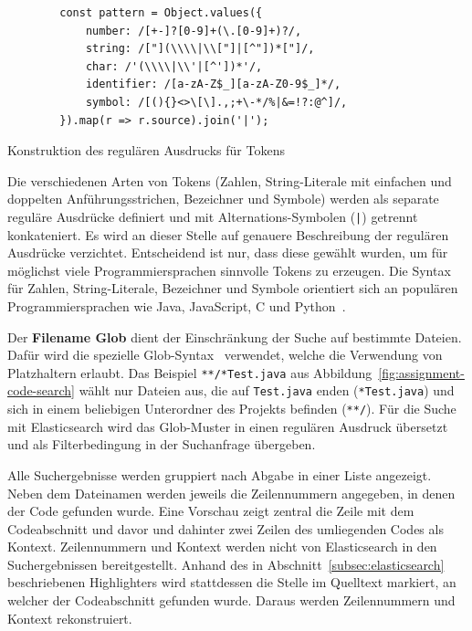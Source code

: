 \begin{listing}
    \centering
    \begin{verbatim}
        const pattern = Object.values({
            number: /[+-]?[0-9]+(\.[0-9]+)?/,
            string: /["](\\\\|\\["]|[^"])*["]/,
            char: /'(\\\\|\\'|[^'])*'/,
            identifier: /[a-zA-Z$_][a-zA-Z0-9$_]*/,
            symbol: /[(){}<>\[\].,;+\-*/%|&=!?:@^]/,
        }).map(r => r.source).join('|');
    \end{verbatim}
    \caption{Konstruktion des regulären Ausdrucks für Tokens}
    \label{lst:code-search-regex-builder}
\end{listing}

Die verschiedenen Arten von Tokens (Zahlen, String-Literale mit einfachen und doppelten Anführungsstrichen, Bezeichner und Symbole) werden als separate reguläre Ausdrücke definiert und mit Alternations-Symbolen (\texttt{|}) getrennt konkateniert.
Es wird an dieser Stelle auf genauere Beschreibung der regulären Ausdrücke verzichtet.
Entscheidend ist nur, dass diese gewählt wurden, um für möglichst viele Programmiersprachen sinnvolle Tokens zu erzeugen.
Die Syntax für Zahlen, String-Literale, Bezeichner und Symbole orientiert sich an populären Programmiersprachen wie Java, JavaScript, C und Python~\cite{tiobe-index}.

Der \textbf{Filename Glob} dient der Einschränkung der Suche auf bestimmte Dateien.
Dafür wird die spezielle Glob-Syntax~\cite{glob-patterns} verwendet, welche die Verwendung von Platzhaltern erlaubt.
Das Beispiel \texttt{**/*Test.java} aus Abbildung~\ref{fig:assignment-code-search} wählt nur Dateien aus, die auf \texttt{Test.java} enden (\texttt{*Test.java}) und sich in einem beliebigen Unterordner des Projekts befinden (\texttt{**/}).
Für die Suche mit Elasticsearch wird das Glob-Muster in einen regulären Ausdruck übersetzt und als Filterbedingung in der Suchanfrage übergeben.

Alle Suchergebnisse werden gruppiert nach Abgabe in einer Liste angezeigt.
Neben dem Dateinamen werden jeweils die Zeilennummern angegeben, in denen der Code gefunden wurde.
Eine Vorschau zeigt zentral die Zeile mit dem Codeabschnitt und davor und dahinter zwei Zeilen des umliegenden Codes als Kontext.
Zeilennummern und Kontext werden nicht von Elasticsearch in den Suchergebnissen bereitgestellt.
Anhand des in Abschnitt~\ref{subsec:elasticsearch} beschriebenen Highlighters wird stattdessen die Stelle im Quelltext markiert, an welcher der Codeabschnitt gefunden wurde.
Daraus werden Zeilennummern und Kontext rekonstruiert.

